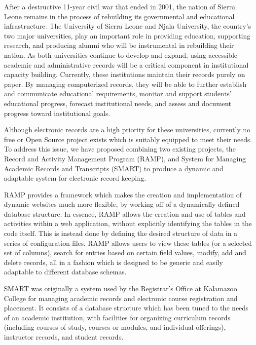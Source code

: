 \documentclass[12pt]{article}
\begin{document}
After a destructive 11-year civil war that ended in 2001, the nation of Sierra Leone remains in the process of rebuilding its governmental and educational infrastructure. The University of Sierra Leone and Njala University, the country's two major universities, play an important role in providing education, supporting research, and producing alumni who will be instrumental in rebuilding their nation. As both universities continue to develop and expand, using accessible academic and administrative records will be a critical component in institutional capacity building. Currently, these institutions maintain their records purely on paper. By managing computerized records, they will be able to further establish and communicate educational requirements, monitor and support students' educational progress, forecast institutional needs, and assess and document progress toward institutional goals.

Although electronic records are a high priority for these universities, currently no free or Open Source project exists which is suitably equipped to meet their needs. To address this issue, we have proposed combining two existing projects, the Record and Activity Management Program (RAMP), and System for Managing Academic Records and Transcripts (SMART) to produce a dynamic and adaptable system for electronic record keeping.

RAMP provides a framework which makes the creation and implementation of dynamic websites much more flexible, by working off of a dynamically defined database structure. In essence, RAMP allows the creation and use of tables and activities within a web application, without explicitly identifying the tables in the code itself. This is instead done by defining the desired structure of data in a series of configuration files. RAMP allows users to view these tables (or a selected set of columns), search for entries based on certain field values, modify, add and delete records, all in a fashion which is designed to be generic and easily adaptable to different database schemas.

SMART was originally a system used by the Registrar's Office at Kalamazoo College for managing academic records and electronic course registration and placement. It consists of a database structure which has been tuned to the needs of an academic institution, with facilities for organizing curriculum records (including courses of study, courses or modules, and individual offerings), instructor records, and student records.
\end{document}
